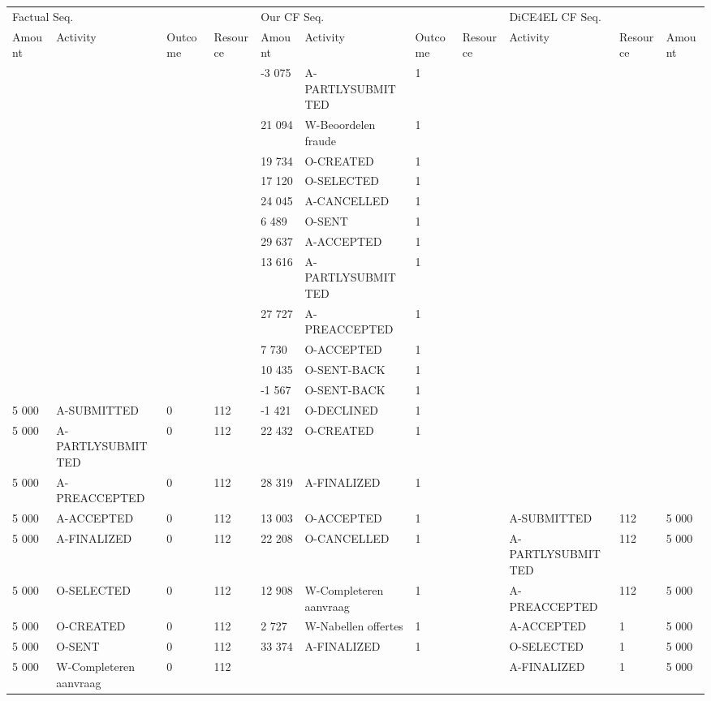 \begin{tabular}{lllllllllll}
\toprule
\multicolumn{4}{l}{Factual Seq.} & \multicolumn{4}{l}{Our CF Seq.} & \multicolumn{3}{l}{DiCE4EL CF Seq.} \\
Amount & Activity & Outcome & Resource & Amount & Activity & Outcome & Resource & Activity & Resource & Amount \\
\midrule
 &  &  &  & -3 075 & A-PARTLYSUBMITTED & 1 &  &  &  &  \\
 &  &  &  & 21 094 & W-Beoordelen fraude & 1 &  &  &  &  \\
 &  &  &  & 19 734 & O-CREATED & 1 &  &  &  &  \\
 &  &  &  & 17 120 & O-SELECTED & 1 &  &  &  &  \\
 &  &  &  & 24 045 & A-CANCELLED & 1 &  &  &  &  \\
 &  &  &  & 6 489 & O-SENT & 1 &  &  &  &  \\
 &  &  &  & 29 637 & A-ACCEPTED & 1 &  &  &  &  \\
 &  &  &  & 13 616 & A-PARTLYSUBMITTED & 1 &  &  &  &  \\
 &  &  &  & 27 727 & A-PREACCEPTED & 1 &  &  &  &  \\
 &  &  &  & 7 730 & O-ACCEPTED & 1 &  &  &  &  \\
 &  &  &  & 10 435 & O-SENT-BACK & 1 &  &  &  &  \\
 &  &  &  & -1 567 & O-SENT-BACK & 1 &  &  &  &  \\
5 000 & A-SUBMITTED & 0 & 112 & -1 421 & O-DECLINED & 1 &  &  &  &  \\
5 000 & A-PARTLYSUBMITTED & 0 & 112 & 22 432 & O-CREATED & 1 &  &  &  &  \\
5 000 & A-PREACCEPTED & 0 & 112 & 28 319 & A-FINALIZED & 1 &  &  &  &  \\
5 000 & A-ACCEPTED & 0 & 112 & 13 003 & O-ACCEPTED & 1 &  & A-SUBMITTED & 112 & 5 000 \\
5 000 & A-FINALIZED & 0 & 112 & 22 208 & O-CANCELLED & 1 &  & A-PARTLYSUBMITTED & 112 & 5 000 \\
5 000 & O-SELECTED & 0 & 112 & 12 908 & W-Completeren aanvraag & 1 &  & A-PREACCEPTED & 112 & 5 000 \\
5 000 & O-CREATED & 0 & 112 & 2 727 & W-Nabellen offertes & 1 &  & A-ACCEPTED & 1 & 5 000 \\
5 000 & O-SENT & 0 & 112 & 33 374 & A-FINALIZED & 1 &  & O-SELECTED & 1 & 5 000 \\
5 000 & W-Completeren aanvraag & 0 & 112 &  &  &  &  & A-FINALIZED & 1 & 5 000 \\

\end{tabular}
